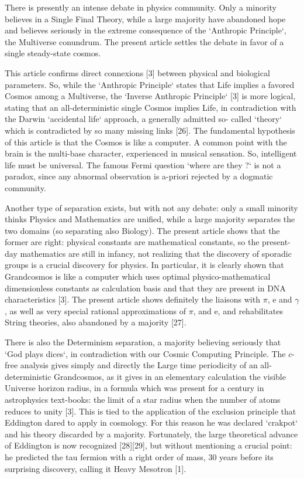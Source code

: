 \documentclass[twoside,draft]{article}
\begin{document}
\begin{sloppypar}
{There is presently an intense debate in physics community. Only a minority believes in a Single
Final Theory, while a large majority have abandoned hope and believes seriously in the extreme
consequence of the `Anthropic Principle`, the Multiverse conundrum. The present article settles the
debate in favor of a single steady-state cosmos.

This article confirms direct connexions [3] between physical and biological parameters. So,
while the `Anthropic Principle` states that Life implies a favored Cosmos among a Multiverse, the
`Inverse Anthropic Principle` [3] is more logical, stating that an all-deterministic single Cosmos
implies Life, in contradiction with the Darwin `accidental life` approach, a generally admitted so-
called `theory` which is contradicted by so many missing links [26]. The fundamental hypothesis of
this article is that the Cosmos is like a computer. A common point with the brain is the multi-base
character, experienced in musical sensation. So, intelligent life must be universal. The famous Fermi
question `where are they ?` is not a paradox, since any abnormal observation is a-priori rejected by a
dogmatic community.

Another type of separation exists, but with not any debate: only a small minority thinks Physics
and Mathematics are unified, while a large majority separates the two domains (so separating also
Biology). The present article shows that the former are right: physical constants are mathematical
constants, so the present-day mathematics are still in infancy, not realizing that the discovery of
sporadic groups is a crucial discovery for physics. In particular, it is clearly shown that
Grandcosmos is like a computer which uses optimal physico-mathematical dimensionless constants as
calculation basis and that they are present in DNA characteristics [3]. The present article shows
definitely the liaisons with $\pi$, e and $\gamma$, as well as very special rational approximations of 
$\pi$, and e, and rehabilitates String theories, also abandoned by a
majority [27].

There is also the Determinism separation, a majority believing seriously that `God plays dices`,
in contradiction with our Cosmic Computing Principle. The $c$-free analysis gives simply and
directly the Large time periodicity of an all-deterministic Grandcosmos, as it gives in an elementary
calculation the visible Universe horizon radius, in a formula which was present for a century in
astrophysics text-books: the limit of a star radius when the number of atoms reduces to unity [3].
This is tied to the application of the exclusion principle that Eddington dared to apply in
cosmology. For this reason he was declared `crakpot` and his theory discarded by a majority.
Fortunately, the large theoretical advance of Eddington is now recognized [28][29], but without
mentioning a crucial point: he predicted the tau fermion with a right order of mass, 30 years before its surprising discovery, calling it Heavy Mesotron [1].

}
\end{sloppypar}
\end{document}
